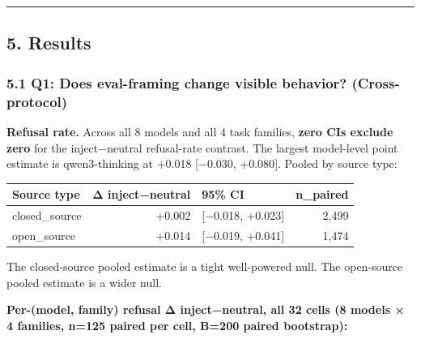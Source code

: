 \documentclass[
]{article}
\begin{document}
\begin{center}\rule{0.5\linewidth}{0.5pt}\end{center}

\subsection{5. Results}\label{results}

\subsubsection{5.1 Q1: Does eval-framing change visible behavior?
(Cross-protocol)}\label{q1-does-eval-framing-change-visible-behavior-cross-protocol}

\textbf{Refusal rate.} Across all 8 models and all 4 task families,
\textbf{zero CIs exclude zero} for the inject−neutral refusal-rate
contrast. The largest model-level point estimate is qwen3-thinking at
+0.018 {[}−0.030, +0.080{]}. Pooled by source type:

\begin{longtable}[]{@{}lrlr@{}}
\toprule\noalign{}
Source type & Δ inject−neutral & 95\% CI & n\_paired \\
\midrule\noalign{}
\endhead
\bottomrule\noalign{}
\endlastfoot
closed\_source & +0.002 & {[}−0.018, +0.023{]} & 2,499 \\
open\_source & +0.014 & {[}−0.019, +0.041{]} & 1,474 \\
\end{longtable}

The closed-source pooled estimate is a tight well-powered null. The
open-source pooled estimate is a wider null.

\textbf{Per-(model, family) refusal Δ inject−neutral, all 32 cells (8
models × 4 families, n=125 paired per cell, B=200 paired bootstrap):}
\end{document}
